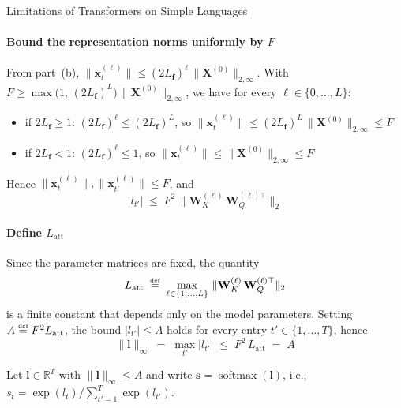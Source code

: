 \begin{question}{Limitations of Transformers on Simple Languages}
\begin{subquestion}
    \paragraph{Bound the representation norms uniformly by $F$}
    From part~(b), $\|\mathbf{x}_t^{(\ell)}\| \le (2L_{\mathbf{f}})^{\ell}\,\|\mathbf{X}^{(0)}\|_{2,\infty}$. With $F \ge \max\!\bigl(1,\, (2L_{\mathbf{f}})^{L}\bigr)\,\|\mathbf{X}^{(0)}\|_{2,\infty}$, we have for every $\ell \in \{0, \dots, L\}$:
    \begin{itemize}
        \item if $2L_{\mathbf{f}} \ge 1$: $(2L_{\mathbf{f}})^{\ell} \le (2L_{\mathbf{f}})^{L}$, so $\|\mathbf{x}_t^{(\ell)}\| \le (2L_{\mathbf{f}})^{L}\,\|\mathbf{X}^{(0)}\|_{2,\infty} \le F$
        \item if $2L_{\mathbf{f}} < 1$: $(2L_{\mathbf{f}})^{\ell} \le 1$, so $\|\mathbf{x}_t^{(\ell)}\| \le \|\mathbf{X}^{(0)}\|_{2,\infty} \le F$
    \end{itemize}
    Hence $\|\mathbf{x}_t^{(\ell)}\|, \|\mathbf{x}_{t'}^{(\ell)}\| \le F$, and
    \begin{equation*}
        |l_{t'}| \;\le\; F^{2}\, \|\mathbf{W}_K^{(\ell)}\, \mathbf{W}_Q^{(\ell)\top}\|_{2}
    \end{equation*}

    \paragraph{Define $L_{\mathrm{att}}$}
    Since the parameter matrices are fixed, the quantity
    \begin{equation*}
        L_{\mathrm{att}} \;\mathrel{\stackrel{\textnormal{\tiny def}}{=}}\; \max_{\ell \in \{1, \dots, L\}}\, \|\mathbf{W}_K^{(\ell)}\, \mathbf{W}_Q^{(\ell)\top}\|_{2}
    \end{equation*}
    is a finite constant that depends only on the model parameters. Setting $A \mathrel{\stackrel{\textnormal{\tiny def}}{=}} F^{2} L_{\mathrm{att}}$, the bound $|l_{t'}| \le A$ holds for every entry $t' \in \{1, \dots, T\}$, hence
    \begin{equation*}
        \|\mathbf{l}\|_{\infty} \;=\; \max_{t'} |l_{t'}| \;\le\; F^{2}\, L_{\mathrm{att}} \;=\; A
    \end{equation*}
\end{subquestion}

\begin{subquestion}
    Let $\mathbf{l} \in \mathbb{R}^{T}$ with $\|\mathbf{l}\|_{\infty} \le A$ and write $\mathbf{s} = \operatorname{softmax}(\mathbf{l})$, i.e., $s_t = \exp(l_t) / \sum_{t'=1}^{T} \exp(l_{t'})$.


\end{subquestion}
\end{question}
